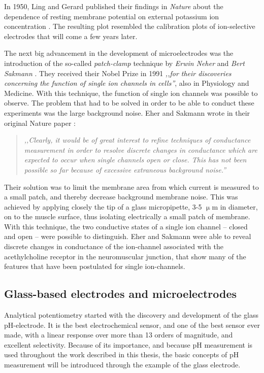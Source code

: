 In 1950, Ling and Gerard published their findings in \emph{Nature} about the dependence of resting membrane potential on external potassium ion concentration \cite{ling1950external}.
The resulting plot resembled the calibration plots of ion-selective electrodes that will come a few years later.

The next big advancement in the development of microelectrodes was the introduction of the so-called \emph{patch-clamp} technique by \emph{Erwin Neher} and \emph{Bert Sakmann} \cite{neher1976single, neher1978extracellular}.
They received their Nobel Prize in 1991 \emph{,,for their discoveries concerning the function of single ion channels in cells''}, also in Physiology and Medicine.
With this technique, the function of single ion channels was possible to observe.
The problem that had to be solved in order to be able to conduct these experiments was the large background noise.
Eher and Sakmann wrote in their original Nature paper \cite{neher1976single}:

\begin{quote}
\vspace{0.5cm}
\emph{,,Clearly, it would be of great interest to refine techniques of conductance measurement in order to resolve discrete changes in conductance which are expected to occur when single channels open or close.
This has not been possible so far because of excessive extraneous background noise.''}
\vspace{0.5cm}
\end{quote} 

Their solution was to limit the membrane area from which current is measured to a small patch, and thereby decrease background membrane noise.
This was achieved by applying closely the tip of a glass micropipette, 3-5 $\upmu$m in diameter, on to the muscle surface, thus isolating electrically a small patch of membrane.
With this technique, the two conductive states of a single ion channel -- closed and open -- were possible to distinguish.
Eher and Sakmann were able to reveal discrete changes in conductance of the ion-channel associated with the acethylcholine receptor in the neuromuscular junction, that show many of the features that have been postulated for single ion-channels.

\subsection{Glass-based electrodes and microelectrodes}
Analytical potentiometry started with the discovery and development of the glass pH-electrode. It is the best electrochemical sensor, and one of the best sensor ever made, with a linear response over more than 13 orders of magnitude, and excellent selectivity.
Because of its importance, and because pH measurement is used throughout the work described in this thesis, the basic concepts of pH measurement will be introduced through the example of the glass electrode.

